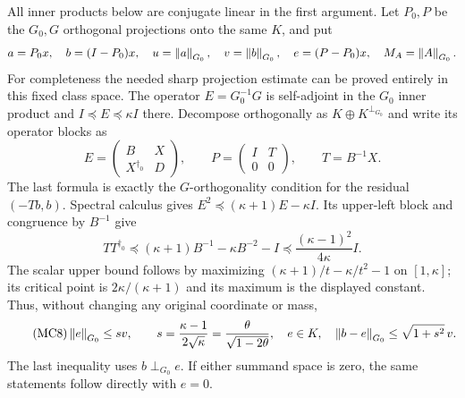 All inner products below are conjugate linear in the first
argument. Let $P_0,P$ be the $G_0,G$ orthogonal projections
onto the same $K$, and put
\[
 a=P_0x,\quad b=(I-P_0)x,\quad
 u=\left\lVert a\right\rVert_{G_0},\quad v=\left\lVert b\right\rVert_{G_0},\quad
 e=(P-P_0)x,\quad M_A=\left\lVert A\right\rVert_{G_0}.
\]
For completeness the needed sharp projection estimate can be
proved entirely in this fixed class space. The operator
$E=G_0^{-1}G$ is self-adjoint in the $G_0$ inner product and
$I\preceq E\preceq\kappa I$ there. Decompose orthogonally as
$K\oplus K^{\perp_{G_0}}$ and write its operator blocks as
\[
 E=\begin{pmatrix}B&X\\X^{\dagger_0}&D\end{pmatrix},\qquad
 P=\begin{pmatrix}I&T\\0&0\end{pmatrix},\qquad T=B^{-1}X.
\]
The last formula is exactly the $G$-orthogonality condition for
the residual $(-Tb,b)$. Spectral calculus gives
$E^2\preceq(\kappa+1)E-\kappa I$. Its upper-left block and
congruence by $B^{-1}$ give
\[
 TT^{\dagger_0}\preceq(\kappa+1)B^{-1}-\kappa B^{-2}-I
 \preceq\frac{(\kappa-1)^2}{4\kappa}I.
\]
The scalar upper bound follows by maximizing
$(\kappa+1)/t-\kappa/t^2-1$ on $[1,\kappa]$; its critical
point is $2\kappa/(\kappa+1)$ and its maximum is the displayed
constant. Thus, without changing any original coordinate or mass,
\begin{equation}\tag{MC8}\label{mcind:eq:projection}
 \left\lVert e\right\rVert_{G_0}\le sv,\qquad
 s=\frac{\kappa-1}{2\sqrt\kappa}
   =\frac{\theta}{\sqrt{1-2\theta}},\quad e\in K,
 \quad\left\lVert b-e\right\rVert_{G_0}\le\sqrt{1+s^2}\,v.
\end{equation}
The last inequality uses $b\perp_{G_0}e$. If either summand
space is zero, the same statements follow directly with $e=0$.


